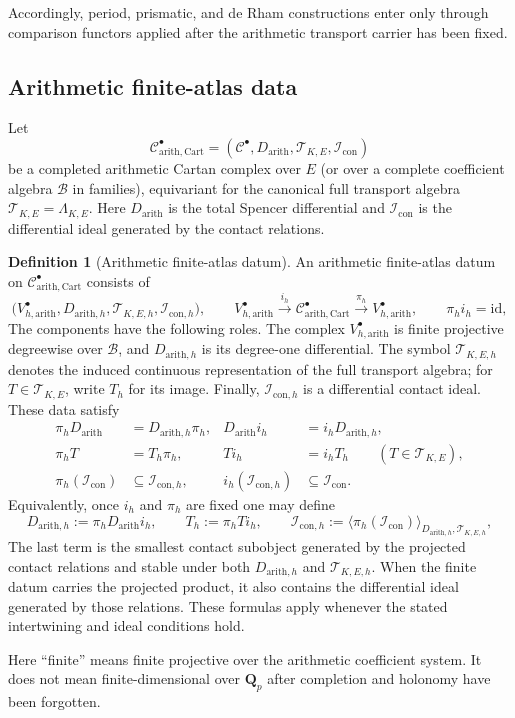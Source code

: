 \documentclass[11pt]{article}
\theoremstyle{definition}
\newtheorem{definition}[theorem]{Definition}
\newcommand{\Qp}{\mathbf Q_p}
\newcommand{\cC}{\mathcal C}
\newcommand{\cI}{\mathcal I}
\newcommand{\arith}{\mathrm{arith}}
\begin{document}
Accordingly, period, prismatic, and de Rham constructions enter only through comparison functors applied after the arithmetic transport carrier has been fixed.

\subsection{Arithmetic finite-atlas data}

Let
\[
\cC^\bullet_{\arith,\mathrm{Cart}}
=(\cC^\bullet,D_{\arith},\mathcal T_{K,E},\cI_{\mathrm{con}})
\]
be a completed arithmetic Cartan complex over $E$ (or over a complete coefficient algebra $\mathcal B$ in families), equivariant for the canonical full transport algebra $\mathcal T_{K,E}=\Lambda_{K,E}$.  Here $D_{\arith}$ is the total Spencer differential and $\cI_{\mathrm{con}}$ is the differential ideal generated by the contact relations.

\begin{definition}[Arithmetic finite-atlas datum]\label{def:arithmetic-finite-atlas}
An arithmetic finite-atlas datum on $\cC^\bullet_{\arith,\mathrm{Cart}}$ consists of
\[
\bigl(V^\bullet_{h,\arith},D_{\arith,h},\mathcal T_{K,E,h},\cI_{\mathrm{con},h}\bigr),
\qquad
V^\bullet_{h,\arith}
\xrightarrow{\,i_h\,}
\cC^\bullet_{\arith,\mathrm{Cart}}
\xrightarrow{\,\pi_h\,}
V^\bullet_{h,\arith},
\qquad
\pi_h i_h=\mathrm{id},
\]
The components have the following roles.  The complex $V^\bullet_{h,\arith}$ is finite projective degreewise over $\mathcal B$, and $D_{\arith,h}$ is its degree-one differential.  The symbol $\mathcal T_{K,E,h}$ denotes the induced continuous representation of the full transport algebra; for $T\in\mathcal T_{K,E}$, write $T_h$ for its image.  Finally, $\cI_{\mathrm{con},h}$ is a differential contact ideal.  These data satisfy
\begin{align}
\pi_hD_{\arith}&=D_{\arith,h}\pi_h,
& D_{\arith}i_h&=i_hD_{\arith,h},\label{eq:finite-atlas-d}\\
\pi_hT&=T_h\pi_h,
& Ti_h&=i_hT_h
\qquad(T\in\mathcal T_{K,E}),\label{eq:finite-atlas-transport}\\
\pi_h(\cI_{\mathrm{con}})&\subseteq \cI_{\mathrm{con},h},
& i_h(\cI_{\mathrm{con},h})&\subseteq \cI_{\mathrm{con}}.\label{eq:finite-atlas-contact}
\end{align}
Equivalently, once $i_h$ and $\pi_h$ are fixed one may define
\[
D_{\arith,h}:=\pi_hD_{\arith}i_h,
\qquad
T_h:=\pi_hTi_h,
\qquad
\cI_{\mathrm{con},h}:=\bigl\langle\pi_h(\cI_{\mathrm{con}})\bigr\rangle_{D_{\arith,h},\mathcal T_{K,E,h}},
\]
The last term is the smallest contact subobject generated by the projected contact relations and stable under both $D_{\arith,h}$ and $\mathcal T_{K,E,h}$.  When the finite datum carries the projected product, it also contains the differential ideal generated by those relations.  These formulas apply whenever the stated intertwining and ideal conditions hold.

Here ``finite'' means finite projective over the arithmetic coefficient system.  It does not mean finite-dimensional over $\Qp$ after completion and holonomy have been forgotten.
\end{definition}
\end{document}
